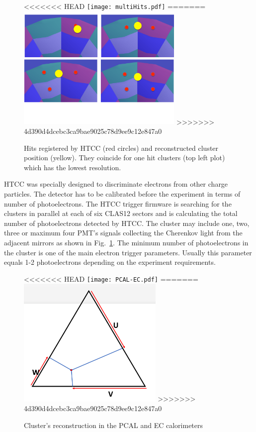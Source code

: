 \begin{figure}[htp]
\begin{center}
\centering
<<<<<<< HEAD
\texttt{[image: multiHits.pdf]}
=======
\includegraphics[width=8cm]{img/multiHits.pdf}
>>>>>>> 4d390d4dcebc3ca9bae9025c78d9ee9c12e847a0
\caption{Hits registered by HTCC (red circles) and reconstructed cluster position (yellow). They coincide for one hit clusters (top left plot) which has the lowest resolution.}
\label{fig:multihitHTCC}
\end{center}
\end{figure} 

HTCC  was specially designed to discriminate electrons from other charge particles. 
The detector has to be calibrated before the experiment in terms of number of photoelectrons. The HTCC trigger firmware
is searching for the clusters in parallel at each of six CLAS12 sectors and is calculating the total number of photoelectrons  detected by HTCC. The cluster may include one, two, three or maximum four PMT's signals collecting the Cherenkov light from the adjacent mirrors as shown in  Fig.~\ref{fig:multihitHTCC}. The minimum number of  photoelectrons in the cluster  is one of the main electron trigger parameters. Usually this parameter equals 1-2 photoelectrons depending on the experiment requirements.
\begin{figure}[htp]
\begin{center}
\centering
<<<<<<< HEAD
\texttt{[image: PCAL-EC.pdf]}
=======
\includegraphics[width=7cm]{img/PCAL-EC.pdf}
>>>>>>> 4d390d4dcebc3ca9bae9025c78d9ee9c12e847a0
\caption{Cluster's reconstruction in the PCAL and EC calorimeters}
\label{fig:PCAL}
\end{center}
\end{figure} 

